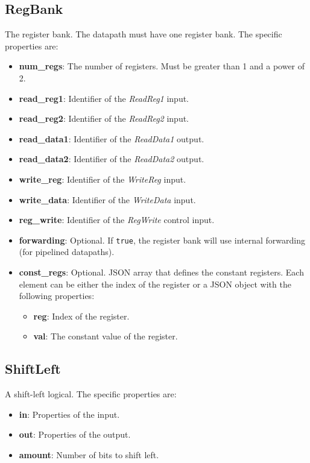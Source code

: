 \documentclass[11pt,a4paper,twoside,titlepage]{report}
\begin{document}
\subsection{RegBank}

The register bank. The datapath must have one register bank.
The specific properties are:
\begin{itemize}
	\item \textbf{num\_regs}: The number of registers. Must be greater than 1 and
		a power of 2.
	\item \textbf{read\_reg1}: Identifier of the \emph{ReadReg1} input.
	\item \textbf{read\_reg2}: Identifier of the \emph{ReadReg2} input.
	\item \textbf{read\_data1}: Identifier of the \emph{ReadData1} output.
	\item \textbf{read\_data2}: Identifier of the \emph{ReadData2} output.
	\item \textbf{write\_reg}: Identifier of the \emph{WriteReg} input.
	\item \textbf{write\_data}: Identifier of the \emph{WriteData} input.
	\item \textbf{reg\_write}: Identifier of the \emph{RegWrite} control input.
	\item \textbf{forwarding}: Optional. If \verb+true+, the register bank will use 
		internal forwarding (for pipelined datapaths).
	\item \textbf{const\_regs}: Optional. JSON array that defines the constant 
		registers. Each element can be either the index of the register or a JSON 
		object with the following properties:
		\begin{itemize}
			\item \textbf{reg}: Index of the register.
			\item \textbf{val}: The constant value of the register.
		\end{itemize}
\end{itemize}

\subsection{ShiftLeft}

A shift-left logical. The specific properties are:
\begin{itemize}
	\item \textbf{in}: Properties of the input.
	\item \textbf{out}: Properties of the output.
	\item \textbf{amount}: Number of bits to shift left.
\end{itemize}
\end{document}
